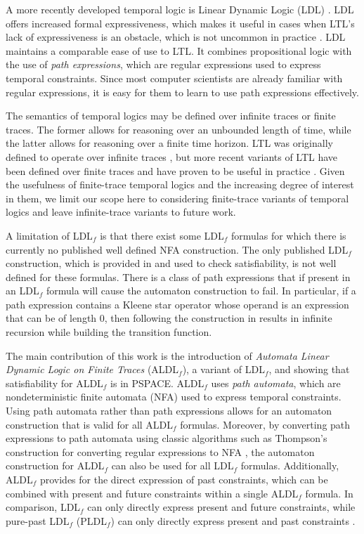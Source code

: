 \documentclass{lmcs}
\theoremstyle{definition}
\DeclareMathOperator{\?}{?}
\begin{document}
A more recently developed temporal logic is Linear Dynamic Logic (LDL) \cite{ldlf}. LDL offers increased formal expressiveness, which makes it useful in cases when LTL's lack of expressiveness is an obstacle, which is not uncommon in practice \cite{ldlf}. LDL maintains a comparable ease of use to LTL. It combines propositional logic with the use of \textit{path expressions}, which are regular expressions used to express temporal constraints. Since most computer scientists are already familiar with regular expressions, it is easy for them to learn to use path expressions effectively.

The semantics of temporal logics may be defined over infinite traces or finite traces. The former allows for reasoning over an unbounded length of time, while the latter allows for reasoning over a finite time horizon. LTL was originally defined to operate over infinite traces \cite{pnueli77}, but more recent variants of LTL have been defined over finite traces and have proven to be useful in practice \cite{aalst,pevsic,ldlf}. Given the usefulness of finite-trace temporal logics and the increasing degree of interest in them, we limit our scope here to considering finite-trace variants of temporal logics and leave infinite-trace variants to future work.

A limitation of LDL$_f$ is that there exist some LDL$_f$ formulas for which there is currently no published well defined NFA construction. The only published LDL$_f$ construction, which is provided in \cite{ldlf} and used to check satisfiability, is not well defined for these formulas. There is a class of path expressions that if present in an LDL$_f$ formula will cause the automaton construction to fail. In particular, if a path expression contains a Kleene star operator whose operand is an expression that can be of length 0, then following the construction in \cite{ldlf} results in infinite recursion while building the transition function.

The main contribution of this work is the introduction of \textit{Automata Linear Dynamic Logic on Finite Traces} (ALDL$_f$), a variant of LDL$_f$, and showing that satisfiability for ALDL$_f$ is in PSPACE. ALDL$_f$ uses \textit{path automata}, which are nondeterministic finite automata (NFA) used to express temporal constraints. Using path automata rather than path expressions allows for an automaton construction that is valid for all ALDL$_f$ formulas. Moreover, by converting path expressions to path automata using classic algorithms such as Thompson's construction for converting regular expressions to NFA \cite{thompson}, the automaton construction for ALDL$_f$ can also be used for all LDL$_f$ formulas. Additionally, ALDL$_f$ provides for the direct expression of past constraints, which can be combined with present and future constraints within a single ALDL$_f$ formula. In comparison, LDL$_f$ can only directly express present and future constraints, while pure-past LDL$_f$ (PLDL$_f$) can only directly express present and past constraints \cite{pldlf}.
\end{document}
